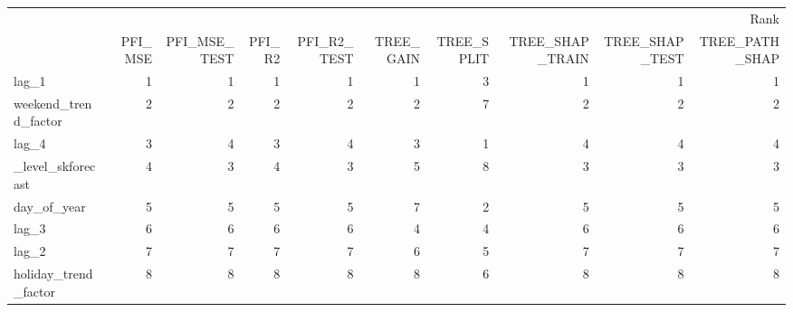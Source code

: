 \begin{tabular}{lrrrrrrrrr}
\toprule
 & \multicolumn{9}{r}{Rank} \\
 & PFI_MSE & PFI_MSE_TEST & PFI_R2 & PFI_R2_TEST & TREE_GAIN & TREE_SPLIT & TREE_SHAP_TRAIN & TREE_SHAP_TEST & TREE_PATH_SHAP \\
\midrule
lag_1 & 1 & 1 & 1 & 1 & 1 & 3 & 1 & 1 & 1 \\
weekend_trend_factor & 2 & 2 & 2 & 2 & 2 & 7 & 2 & 2 & 2 \\
lag_4 & 3 & 4 & 3 & 4 & 3 & 1 & 4 & 4 & 4 \\
_level_skforecast & 4 & 3 & 4 & 3 & 5 & 8 & 3 & 3 & 3 \\
day_of_year & 5 & 5 & 5 & 5 & 7 & 2 & 5 & 5 & 5 \\
lag_3 & 6 & 6 & 6 & 6 & 4 & 4 & 6 & 6 & 6 \\
lag_2 & 7 & 7 & 7 & 7 & 6 & 5 & 7 & 7 & 7 \\
holiday_trend_factor & 8 & 8 & 8 & 8 & 8 & 6 & 8 & 8 & 8 \\
\bottomrule
\end{tabular}
